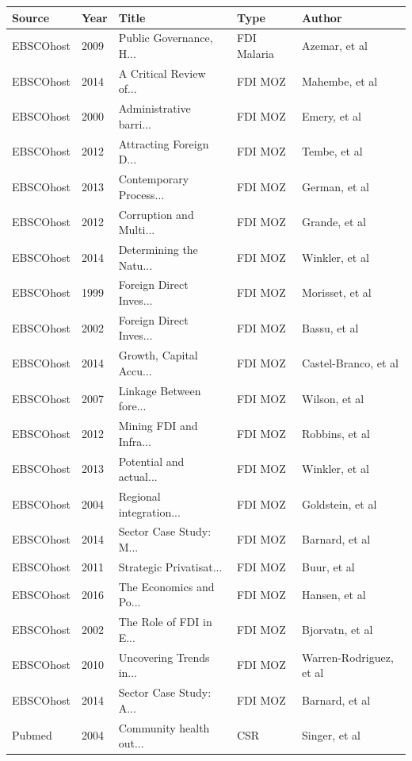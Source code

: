 \documentclass[]{article}
\begin{document}
\begin{longtable}{lllll}
  \hline
Source & Year & Title & Type & Author \\ 
  \hline
EBSCOhost & 2009 & Public Governance, H... & FDI Malaria & Azemar, et al \\ 
  EBSCOhost & 2014 & A Critical Review of... & FDI MOZ & Mahembe, et al \\ 
  EBSCOhost & 2000 & Administrative barri... & FDI MOZ & Emery, et al \\ 
  EBSCOhost & 2012 & Attracting Foreign D... & FDI MOZ & Tembe, et al \\ 
  EBSCOhost & 2013 & Contemporary Process... & FDI MOZ & German, et al \\ 
  EBSCOhost & 2012 & Corruption and Multi... & FDI MOZ & Grande, et al \\ 
  EBSCOhost & 2014 & Determining the Natu... & FDI MOZ & Winkler, et al \\ 
  EBSCOhost & 1999 & Foreign Direct Inves... & FDI MOZ & Morisset, et al \\ 
  EBSCOhost & 2002 & Foreign Direct Inves... & FDI MOZ & Bassu, et al \\ 
  EBSCOhost & 2014 & Growth, Capital Accu... & FDI MOZ & Castel-Branco, et al \\ 
  EBSCOhost & 2007 & Linkage Between fore... & FDI MOZ & Wilson, et al \\ 
  EBSCOhost & 2012 & Mining FDI and Infra... & FDI MOZ & Robbins, et al \\ 
  EBSCOhost & 2013 & Potential and actual... & FDI MOZ & Winkler, et al \\ 
  EBSCOhost & 2004 & Regional integration... & FDI MOZ & Goldstein, et al \\ 
  EBSCOhost & 2014 & Sector Case Study: M... & FDI MOZ & Barnard, et al \\ 
  EBSCOhost & 2011 & Strategic Privatisat... & FDI MOZ & Buur, et al \\ 
  EBSCOhost & 2016 & The Economics and Po... & FDI MOZ & Hansen, et al \\ 
  EBSCOhost & 2002 & The Role of FDI in E... & FDI MOZ & Bjorvatn, et al \\ 
  EBSCOhost & 2010 & Uncovering Trends in... & FDI MOZ & Warren-Rodriguez, et al \\ 
  EBSCOhost & 2014 & Sector Case Study: A... & FDI MOZ & Barnard, et al \\ 
  Pubmed & 2004 & Community health out... & CSR & Singer, et al \\ 

\end{longtable}
\end{document}
